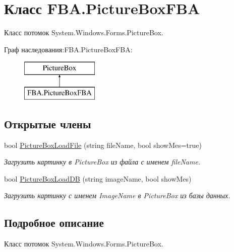 \hypertarget{class_f_b_a_1_1_picture_box_f_b_a}{}\section{Класс F\+B\+A.\+Picture\+Box\+F\+BA}
\label{class_f_b_a_1_1_picture_box_f_b_a}


Класс потомок System.\+Windows.\+Forms.\+Picture\+Box.  


Граф наследования\+:F\+B\+A.\+Picture\+Box\+F\+BA\+:\begin{figure}[H]
\begin{center}
\leavevmode
\includegraphics[height=2.000000cm]{class_f_b_a_1_1_picture_box_f_b_a}
\end{center}
\end{figure}
\subsection*{Открытые члены}
\begin{DoxyCompactItemize}
\item 
bool \mbox{\hyperlink{class_f_b_a_1_1_picture_box_f_b_a_a99bf326bea824ba19d792626139737f8}{Picture\+Box\+Load\+File}} (string file\+Name, bool show\+Mes=true)
\begin{DoxyCompactList}\small\item\em Загрузить картинку в Picture\+Box из файла с именем file\+Name. \end{DoxyCompactList}\item 
bool \mbox{\hyperlink{class_f_b_a_1_1_picture_box_f_b_a_a07e337c0455cef7bca9b8c8559dfb4b9}{Picture\+Box\+Load\+DB}} (string image\+Name, bool show\+Mes)
\begin{DoxyCompactList}\small\item\em Загрузить картинку с именем Image\+Name в Picture\+Box из базы данных. \end{DoxyCompactList}\end{DoxyCompactItemize}


\subsection{Подробное описание}
Класс потомок System.\+Windows.\+Forms.\+Picture\+Box. 



